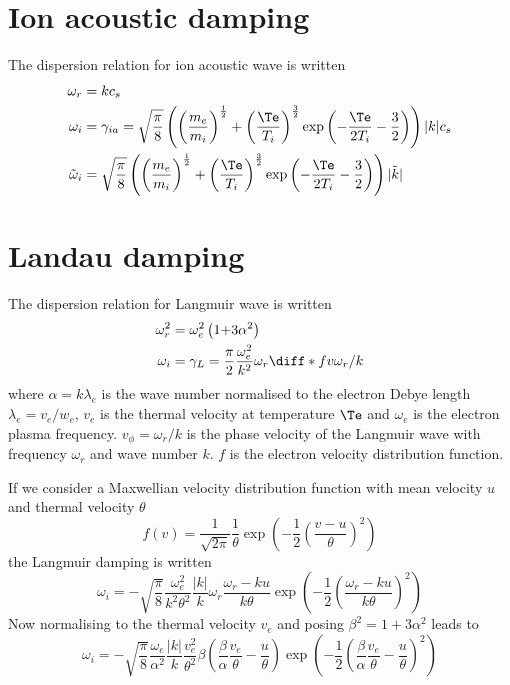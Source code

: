 \documentclass[10pt,a4paper]{article}
\begin{document}
\section{Ion acoustic damping}
The dispersion relation for ion acoustic wave is written
\begin{align}
\omega_r&=kc_s\\
\omega_i&=\gamma_{ia}=\sqrt{\frac{\pi}{8}}
\left(\left(\frac{m_e}{m_i}\right)^\frac{1}{2}+
\left(\frac{\Te}{T_i}\right)^\frac{3}{2}
\exp\left(-\frac{\Te}{2T_i}-\frac{3}{2}\right)\right)|k|c_s\\
\tilde{\omega}_i&=\sqrt{\frac{\pi}{8}}
\left(\left(\frac{m_e}{m_i}\right)^\frac{1}{2}+
\left(\frac{\Te}{T_i}\right)^\frac{3}{2}
\exp\left(-\frac{\Te}{2T_i}-\frac{3}{2}\right)\right)|\tilde{k}|
\end{align}


\section{Landau damping}
The dispersion relation for Langmuir wave is written
\begin{align}
\omega_r^2&=\omega_e^2\left(1{+}3\alpha^2\right)\\
\omega_i&=\gamma_L=\frac{\pi}{2}\frac{\omega_e^2}{k^2}\omega_r
\diff*{f}{v}{\omega_r/k}
\end{align}
where $\alpha=k\lambda_e$ is the wave number normalised to the electron
Debye length $\lambda_e=v_e/w_e$, $v_e$ is the thermal velocity at
temperature
$\Te$ and $\omega_e$ is the electron plasma frequency.
$v_\phi=\omega_r/k$ is the phase velocity of the Langmuir wave with
frequency $\omega_r$ and wave number $k$.
$f$ is the electron velocity
distribution function.

If we consider a Maxwellian velocity distribution function with
mean velocity $u$ and thermal velocity $\theta$
\begin{equation}
f(v)=\frac{1}{\sqrt{2\pi}}\frac{1}{\theta}
\exp\left(-\frac{1}{2}\left(\frac{v-u}{\theta}\right)^2\right)
\end{equation}
the Langmuir damping is written
\begin{equation}
\omega_i=-\sqrt{\frac{\pi}{8}}\frac{\omega_e^2}{k^2\theta^2}\frac{|k|}{k}
\omega_r\frac{\omega_r-ku}{k\theta}
\exp\left(-\frac{1}{2}\left(\frac{\omega_r-ku}{k\theta}\right)^2\right)
\end{equation}
Now normalising to the thermal velocity $v_e$ and posing 
$\beta^2=1{+}3\alpha^2$ 
leads to
\begin{equation}
\omega_i=-\sqrt{\frac{\pi}{8}}\frac{\omega_e}{\alpha^2}\frac{|k|}{k}
\frac{v_e^2}{\theta^2}\beta
\left(\frac{\beta}{\alpha}\frac{v_e}{\theta}-\frac{u}{\theta}\right)
\exp\left(-\frac{1}{2}\left(
\frac{\beta}{\alpha}\frac{v_e}{\theta}-\frac{u}{\theta}
\right)^2\right)
\end{equation}
\end{document}
